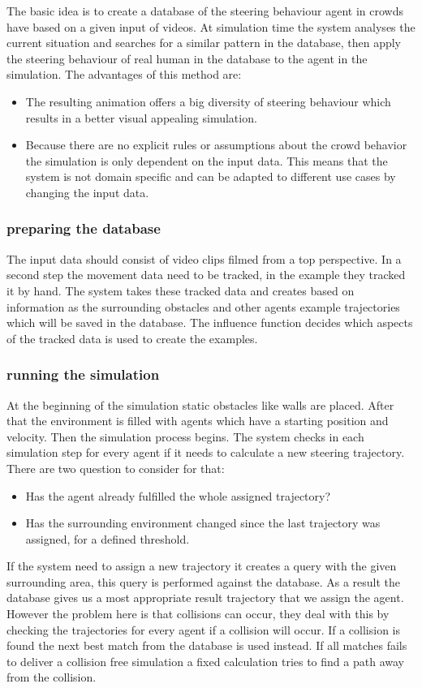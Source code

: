 \documentclass[sigconf]{acmart}
\begin{document}
The basic idea is to create a database of the steering behaviour agent in crowds have based on a given input of videos. At simulation time the system analyses the current situation and searches for a similar pattern in the database, then apply the steering behaviour of real human in the database to the agent in the simulation. The advantages of this method are: 
\begin{itemize}
    \item The resulting animation offers a big diversity of steering behaviour which results in a better visual appealing simulation.
    \item Because there are no explicit rules or assumptions about the crowd behavior the simulation is only dependent on the input data. This means that the system is not domain specific and can be adapted to different use cases by changing the input data.
\end{itemize}

\subsubsection{preparing the database}
The input data should consist of video clips filmed from a top perspective. In a second step the movement data need to be tracked, in the example they tracked it by hand.
The system takes these tracked data and creates based on information as the surrounding obstacles and other agents example trajectories which will be saved in the database. The influence function decides which aspects of the tracked data is used to create the examples. 

\subsubsection{running the simulation}
At the beginning of the simulation static obstacles like walls are placed. After that the environment is filled with agents which have a starting position and velocity. Then the simulation process begins.
The system checks in each simulation step for every agent if it needs to calculate a new steering trajectory. There are two question to consider for that: 
\begin{itemize}
    \item Has the agent already fulfilled the whole assigned trajectory?
    \item Has the surrounding environment changed since the last trajectory was assigned, for a defined threshold.
\end{itemize}
If the system need to assign a new trajectory it creates a query with the given surrounding area, this query is performed against the database. As a result the database gives us a most appropriate result trajectory that we assign the agent. 
However the problem here is that collisions can occur, they deal with this by checking the trajectories for every agent if a collision will occur. If a collision is found the next best match from the database is used instead. If all matches fails to deliver a collision free simulation a fixed calculation tries to find a path away from the collision. 
\end{document}
